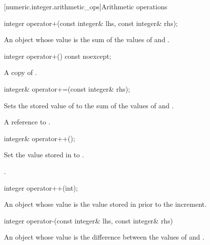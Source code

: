 [numeric.integer.arithmetic_ops]{Arithmetic operations}

\begin{itemdecl}
integer operator+(const integer& lhs, const integer& rhs);	
\end{itemdecl}

\begin{itemdescr}
\returns An object whose value is the sum of the values of  and .		
\end{itemdescr}

\begin{itemdecl}
integer operator+() const noexcept;	
\end{itemdecl}

\begin{itemdescr}
\returns A copy of .		
\end{itemdescr}

\begin{itemdecl}
integer& operator+=(const integer& rhs);	
\end{itemdecl}

\begin{itemdescr}
\effects Sets the stored value of  to the sum of the values of  and .

\returns A reference to .		
\end{itemdescr}

\begin{itemdecl}
integer& operator++();	
\end{itemdecl}

\begin{itemdescr}
\effects Set the value stored in  to .

\returns {}.		
\end{itemdescr}

\begin{itemdecl}
integer operator++(int);	
\end{itemdecl}

\begin{itemdescr}
\returns An object whose value is the value stored in  prior to the increment.		
\end{itemdescr}

\begin{itemdecl}
integer operator-(const integer& lhs, const integer& rhs)	
\end{itemdecl}

\begin{itemdescr}
\returns An object whose value is the difference between the values of  and .		
\end{itemdescr}


